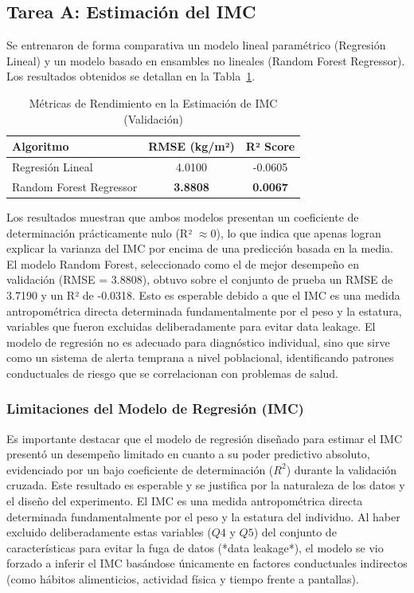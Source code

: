 \documentclass[10pt,journal,compsoc]{IEEEtran}
\begin{document}
\subsection{Tarea A: Estimación del IMC}
Se entrenaron de forma comparativa un modelo lineal paramétrico (Regresión Lineal) y un modelo basado en ensambles no lineales (Random Forest Regressor). Los resultados obtenidos se detallan en la Tabla~\ref{tab:regresion}.

\begin{table}[htbp]
\caption{Métricas de Rendimiento en la Estimación de IMC (Validación)}
\label{tab:regresion}
\centering
\begin{tabular}{lcc}
\toprule
\textbf{Algoritmo} & \textbf{RMSE (kg/m²)} & \textbf{R² Score} \\
\midrule
Regresión Lineal & 4.0100 & -0.0605 \\
Random Forest Regressor & \textbf{3.8808} & \textbf{0.0067} \\
\bottomrule
\end{tabular}
\end{table}

Los resultados muestran que ambos modelos presentan un coeficiente de determinación prácticamente nulo (R² $\approx 0$), lo que indica que apenas logran explicar la varianza del IMC por encima de una predicción basada en la media. El modelo Random Forest, seleccionado como el de mejor desempeño en validación (RMSE = 3.8808), obtuvo sobre el conjunto de prueba un RMSE de 3.7190 y un R² de -0.0318. Esto es esperable debido a que el IMC es una medida antropométrica directa determinada fundamentalmente por el peso y la estatura, variables que fueron excluidas deliberadamente para evitar data leakage. El modelo de regresión no es adecuado para diagnóstico individual, sino que sirve como un sistema de alerta temprana a nivel poblacional, identificando patrones conductuales de riesgo que se correlacionan con problemas de salud.

\subsubsection{Limitaciones del Modelo de Regresión (IMC)}
Es importante destacar que el modelo de regresión diseñado para estimar el IMC presentó un desempeño limitado en cuanto a su poder predictivo absoluto, evidenciado por un bajo coeficiente de determinación (\(R^2\)) durante la validación cruzada. Este resultado es esperable y se justifica por la naturaleza de los datos y el diseño del experimento. El IMC es una medida antropométrica directa determinada fundamentalmente por el peso y la estatura del individuo. Al haber excluido deliberadamente estas variables ($Q4$ y $Q5$) del conjunto de características para evitar la fuga de datos (*data leakage*), el modelo se vio forzado a inferir el IMC basándose únicamente en factores conductuales indirectos (como hábitos alimenticios, actividad física y tiempo frente a pantallas).
\end{document}

